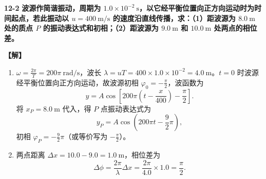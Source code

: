\documentclass[zihao=5,a4paper,UTF8]{ctexart}
\newenvironment{prob}[2]{%
    \par\vspace{6pt}\noindent\textbf{\color{navy}#1} \textbf{#2}\par\nopagebreak\vspace{2pt}%
}{%
    \par\vspace{4pt}%
}
\newcommand{\sol}{\noindent\textbf{\color{tealaccent}【解】}\ }
\begin{document}
\begin{prob}{12-2}{波源作简谐振动，周期为 $1.0\times 10^{-2}\ \mathrm{s}$，以它经平衡位置向正方向运动时为时间起点，若此振动以 $u=400\ \mathrm{m/s}$ 的速度沿直线传播，求：（1）距波源为 $8.0\ \mathrm{m}$ 处的质点 $P$ 的振动表达式和初相；（2）距波源为 $9.0\ \mathrm{m}$ 和 $10.0\ \mathrm{m}$ 处两点的相位差。}
\sol
\begin{enumerate}[leftmargin=2em, itemsep=2pt]
    \item $\omega = \frac{2\pi}{T} = 200\pi\ \mathrm{rad/s}$，波长 $\lambda = uT = 400\times 1.0\times 10^{-2} = 4.0\ \mathrm{m}$。$t=0$ 时波源经平衡位置向正方向运动，故波源初相 $\varphi_0 = -\frac{\pi}{2}$，波函数为
    \[
        y = A\cos\left[200\pi\left(t - \frac{x}{400}\right) - \frac{\pi}{2}\right].
    \]
    将 $x_P = 8.0\ \mathrm{m}$ 代入，得 $P$ 点振动表达式为
    \[
        y_P = A\cos\left(200\pi t - \frac{9}{2}\pi\right),
    \]
    初相 $\varphi_P = -\frac{9}{2}\pi$（或等价写为 $-\frac{\pi}{2}$）。
    \item 两点距离 $\Delta x = 10.0 - 9.0 = 1.0\ \mathrm{m}$，相位差为
    \[
        \Delta\phi = \frac{2\pi}{\lambda}\Delta x = \frac{2\pi}{4.0}\times 1.0 = \frac{\pi}{2}.
    \]
\end{enumerate}
\end{prob}
\end{document}
